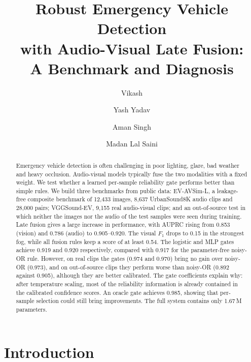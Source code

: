 \documentclass[runningheads,a4paper]{llncs}
\begin{document}
\title{Robust Emergency Vehicle Detection\\ with Audio-Visual Late Fusion:\\
A Benchmark and Diagnosis}

\author{Vikash \and Yash Yadav \and Aman Singh
\and Madan Lal Saini}

\maketitle

\begin{abstract}
Emergency vehicle detection is often challenging in poor lighting, glare, bad
weather and heavy occlusion. Audio-visual models typically fuse the two
modalities with a fixed weight. We test whether a learned per-sample
reliability gate performs better than simple rules. We build three benchmarks
from public data: EV-AVSim-L, a leakage-free composite benchmark of 12,433
images, 8,637 UrbanSound8K audio clips and 28,000 pairs; VGGSound-EV, 9,155 real
audio-visual clips; and an out-of-source test in which neither the images nor
the audio of the test samples were seen during training. Late fusion gives a
large increase in performance, with AUPRC rising from 0.853 (vision) and 0.786
(audio) to 0.905--0.920. The visual $F_1$ drops to 0.15 in the strongest fog,
while all fusion rules keep a score of at least 0.54. The logistic and MLP
gates achieve 0.919 and 0.920 respectively, compared with 0.917 for the
parameter-free noisy-OR rule. However, on real clips the gates (0.974 and
0.970) bring no gain over noisy-OR (0.973), and on out-of-source clips they
perform worse than noisy-OR (0.892 against 0.905), although they are better
calibrated. The gate coefficients explain why: after temperature scaling,
most of the reliability information is already contained in the calibrated
confidence scores. An oracle gate achieves 0.985, showing that per-sample
selection could still bring improvements. The full system contains only
1.67\,M parameters.
\end{abstract}

\section{Introduction}
\end{document}
